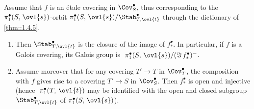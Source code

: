 \begin{cor}\label{cor::1.4.12} Assume that $f$ is an \'etale covering in
 $\Cov^\bullet_S$, thus corresponding to the 
 $\pi_1^\bullet(S,\,\ovl{s})$-orbit
 $\pi_1^\bullet(S,\,\ovl{s})/\Stab^\bullet_{T,\ovl{t}}$ through the 
 dictionary of \ref{thm::1.4.5}.
 \begin{enumerate}
  \renewcommand{\theenumi}{\alph{enumi}}
  \item Then $\Stab^\bullet_{T,\ovl{t}}$ is the closure of the image of
	$f^\bullet_\ast$.  In particular, if $f$ is a Galois covering,
	its Galois group is
	$\;\pi_1^\bullet(S,\,\ovl{s})/(\Im\,f^\bullet_\ast)^-$.
  \item Assume moreover that for any covering $T'\to T$ in
	$\Cov^\bullet_T$, the composition with $f$ gives rise to a
	covering $T'\to S$ in $\Cov^\bullet_S$. Then $f^\bullet_\ast$
	is open and injective (hence $\;\pi_1^\bullet(T,\,\ovl{t})$ may
	be identified with the open and closed subgroup
	$\Stab^\bullet_{T,\ovl{t}}$ of $\pi_1^\bullet(S,\,\ovl{s})$).  
 \end{enumerate}
\end{cor}
